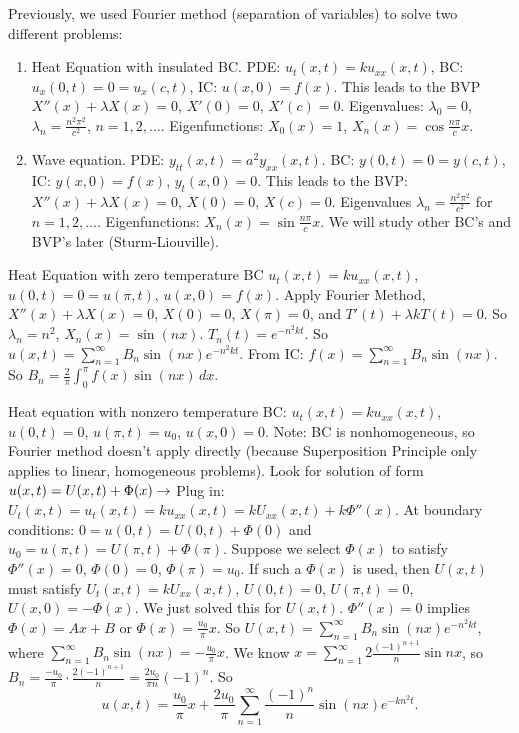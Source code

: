 \documentclass[]{article}
\begin{document}
Previously, we used Fourier method (separation of variables) to solve two different problems:
\begin{enumerate}
	\item Heat Equation with insulated BC. PDE: $u_t(x,t) = ku_{xx} (x,t)$, BC: $u_x(0,t) = 0 = u_x(c,t)$, IC: $u(x,0) = f(x)$. This leads to the BVP $X''(x) + \lambda X(x) = 0$, $X'(0)=0$, $X'(c)=0$. Eigenvalues: $\lambda_0 = 0$, $\lambda_n = \frac{n^2\pi^2}{c^2}$, $n=1,2,\dots$. Eigenfunctions: $X_0(x) = 1$, $X_n(x) = \cos{\frac{n\pi}{c}x}$.
	\item Wave equation. PDE: $y_{tt}(x,t)=a^2y_{xx}(x,t)$. BC: $y(0,t)=0 = y(c,t)$, IC: $y(x,0)=f(x)$, $y_t(x,0)=0$. This leads to the BVP: $X''(x) + \lambda X(x)=0$, $X(0)=0$, $X(c)=0$. Eigenvalues $\lambda_n = \frac{n^2\pi^2}{c^2}$ for $n=1,2,\dots$. Eigenfunctions: $X_n(x) = \sin{\frac{n\pi}{c}x}$. We will study other BC's and BVP's later (Sturm-Liouville).
\end{enumerate}
\begin{example}
	Heat Equation with zero temperature BC $u_t(x,t)=ku_{xx}(x,t)$, $u(0,t)=0=u(\pi,t)$, $u(x,0)=f(x)$.
	Apply Fourier Method, $X''(x) + \lambda X(x) = 0$, $X(0)=0$, $X(\pi) = 0$, and $T'(t) + \lambda k T(t) = 0$. So $\lambda_n = n^2$, $X_n(x) = \sin{(nx)}$. $T_n(t) = e^{-n^2kt}$. So $u(x,t) = \sum_{n=1}^\infty B_n \sin{(nx)} e^{-n^2kt}$. From IC: $f(x) = \sum_{n=1}^\infty B_n \sin{(nx)}$. So $B_n = \frac{2}{\pi} \int_0^\pi f(x) \sin{(nx)} \, dx$.
\end{example}
\begin{example}
	Heat equation with nonzero temperature BC: $u_t(x,t) = ku_{xx}(x,t)$, $u(0,t) = 0$, $u(\pi,t) = u_0$, $u(x,0) = 0$.
	Note: BC is nonhomogeneous, so Fourier method doesn't apply directly (because Superposition Principle only applies to linear, homogeneous problems).
	Look for solution of form $u(x,t) = U(x,t) + \Phi(x) \rightarrow$ Plug in: $U_t(x,t) = u_t(x,t) = ku_{xx}(x,t) = k U_{xx}(x,t) + k \Phi''(x)$. At boundary conditions: $0=u(0,t) = U(0,t) + \Phi(0)$ and $u_0 = u(\pi,t) = U(\pi, t) + \Phi(\pi)$. Suppose we select $\Phi(x)$ to satisfy $\Phi''(x) = 0$, $\Phi(0) = 0$, $\Phi(\pi) = u_0$. If such a $\Phi(x)$ is used, then $U(x,t)$ must satisfy $U_t(x,t) = kU_{xx}(x,t)$, $U(0,t)=0$, $U(\pi,t) = 0$, $U(x,0) = -\Phi(x)$. We just solved this for $U(x,t)$. $\Phi''(x) = 0$ implies $\Phi(x) = Ax+B$ or $\Phi(x) = \frac{u_0}{\pi}x$. So $U(x,t) = \sum_{n=1}^\infty B_n \sin{(nx)}e^{-n^2kt}$, where $\sum_{n=1}^\infty B_n \sin{(nx)} = -\frac{u_0}{\pi}x$.
	We know $x = \sum_{n=1}^\infty 2\frac{(-1)^{n+1}}{n}\sin{nx}$, so $B_n = \frac{-u_0}{\pi} \cdot \frac{2(-1)^{n+1}}{n} = \frac{2u_0}{\pi n}(-1)^n$. So $$u(x,t) = \frac{u_0}{\pi}x + \frac{2u_0}{\pi} \sum_{n=1}^\infty \frac{(-1)^n}{n} \sin{(nx)}e^{-kn^2t}.$$
\end{example}
\end{document}

